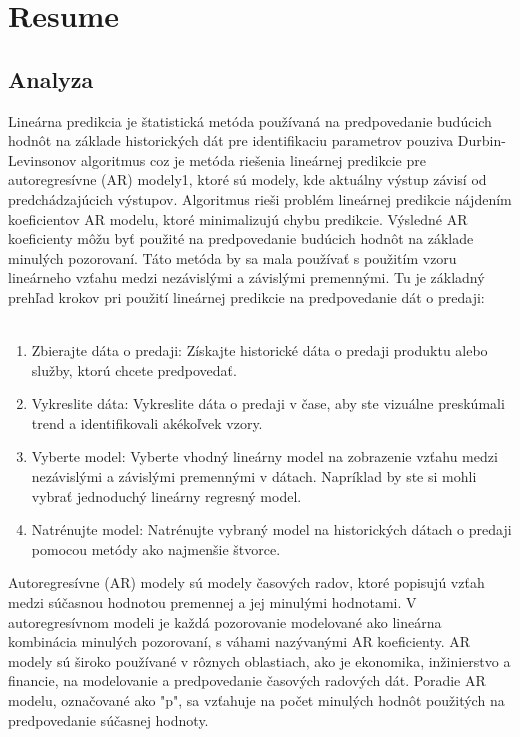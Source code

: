 \chapter{Resume} \label{resume}
    \section{Analyza} \label{sk:analytic}
    Lineárna predikcia je štatistická metóda používaná na predpovedanie budúcich hodnôt na základe historických dát pre identifikaciu parametrov pouziva
    Durbin-Levinsonov algoritmus coz je metóda riešenia lineárnej predikcie pre autoregresívne (AR) modely1, ktoré sú modely, kde aktuálny výstup
    závisí od predchádzajúcich výstupov. Algoritmus rieši problém lineárnej predikcie nájdením koeficientov AR modelu, ktoré minimalizujú chybu predikcie.
    Výsledné AR koeficienty môžu byť použité na predpovedanie budúcich hodnôt na základe minulých pozorovaní. Táto metóda by sa mala
    používať s použitím vzoru lineárneho vzťahu medzi nezávislými a závislými premennými. Tu je základný prehľad krokov pri použití lineárnej
    predikcie na predpovedanie dát o predaji:\\
    \\
    \begin{enumerate}
    \item Zbierajte dáta o predaji: Získajte historické dáta o predaji produktu alebo služby, ktorú chcete predpovedať.
    \item Vykreslite dáta: Vykreslite dáta o predaji v čase, aby ste vizuálne preskúmali trend a identifikovali akékoľvek vzory.
    \item Vyberte model: Vyberte vhodný lineárny model na zobrazenie vzťahu medzi nezávislými a závislými premennými v dátach.
    Napríklad by ste si mohli vybrať jednoduchý lineárny regresný model.
    \item Natrénujte model: Natrénujte vybraný model na historických dátach o predaji pomocou metódy ako najmenšie štvorce.
    \end{enumerate}
    Autoregresívne (AR) modely sú modely časových radov, ktoré popisujú vzťah medzi súčasnou hodnotou premennej a jej minulými hodnotami.
    V autoregresívnom modeli je každá pozorovanie modelované ako lineárna kombinácia minulých pozorovaní, s váhami nazývanými AR koeficienty.
    AR modely sú široko používané v rôznych oblastiach, ako je ekonomika, inžinierstvo a financie, na modelovanie a predpovedanie časových radových dát.
    Poradie AR modelu, označované ako "p", sa vzťahuje na počet minulých hodnôt použitých na predpovedanie súčasnej hodnoty.
